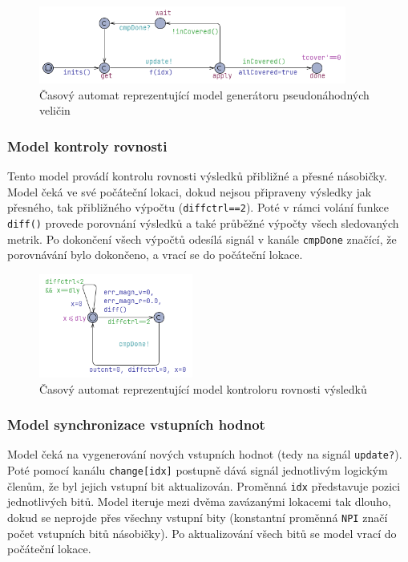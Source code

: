 \begin{figure}[H]
    \centering
    \includegraphics[width=0.9\textwidth]{obrazky-figures/model_tmul2_tb_random.png}
    \caption{Časový automat reprezentující model generátoru pseudonáhodných veličin}
    \label{fig:model_tmul2_tb_random}
\end{figure}

\subsubsection{Model kontroly rovnosti}
Tento model provádí kontrolu rovnosti výsledků přibližné a přesné násobičky. Model čeká ve své počáteční lokaci, dokud nejsou připraveny výsledky jak přesného, tak přibližného výpočtu (\texttt{diffctrl==2}). Poté v rámci volání funkce \texttt{diff()} provede porovnání výsledků a také průběžné výpočty všech sledovaných metrik. Po dokončení všech výpočtů odesílá signál v kanále \texttt{cmpDone} značící, že porovnávání bylo dokončeno, a vrací se do počáteční lokace.

\begin{figure}[H]
    \centering
    \includegraphics[width=0.45\textwidth]{obrazky-figures/model_eval_diff.png}
    \caption{Časový automat reprezentující model kontroloru rovnosti výsledků}
    \label{fig:model_eval_diff}
\end{figure}

\subsubsection{Model synchronizace vstupních hodnot}
Model čeká na vygenerování nových vstupních hodnot (tedy na signál \texttt{update?}). Poté pomocí kanálu \texttt{change[idx]} postupně dává signál jednotlivým logickým členům, že byl jejich vstupní bit aktualizován. Proměnná \texttt{idx} představuje pozici jednotlivých bitů. Model iteruje mezi dvěma zavázanými lokacemi tak dlouho, dokud se neprojde přes všechny vstupní bity (konstantní proměnná \texttt{NPI} značí počet vstupních bitů násobičky). Po aktualizování všech bitů se model vrací do počáteční lokace.

